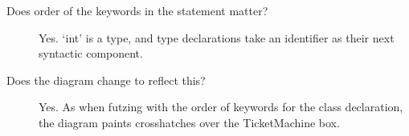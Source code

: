 \begin{description}
	\item [Does order of the keywords in the statement
		 matter?] Yes. `int' is a
		type, and type declarations take an identifier as their
		next syntactic component.
	\item [Does the diagram change to reflect this?] Yes. As when
		futzing with the order of keywords for the class
		declaration, the diagram paints crosshatches over the
		TicketMachine box.
\end{description}
